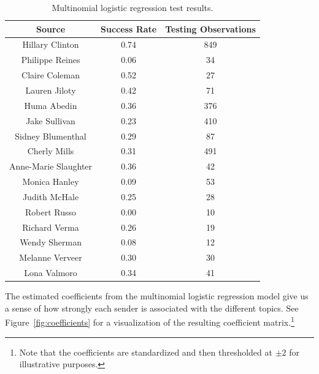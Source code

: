 \documentclass[12pt]{article}
\theoremstyle{definition}
\theoremstyle{algodesc}
\begin{document}
\begin{table}[htb] \centering
\begin{tabular}{ccc}
  \toprule
  Source               & Success Rate & Testing Observations \\
  \midrule
  Hillary Clinton      & 0.74         & 849 \\
  Philippe Reines      & 0.06         & 34 \\
  Claire Coleman       & 0.52         & 27 \\
  Lauren Jiloty        & 0.42         & 71 \\
  Huma Abedin          & 0.36         & 376 \\
  Jake Sullivan        & 0.23         & 410 \\
  Sidney Blumenthal    & 0.29         & 87 \\
  Cherly Mills         & 0.31         & 491 \\
  Anne-Marie Slaughter & 0.36         & 42 \\
  Monica Hanley        & 0.09         & 53 \\
  Judith McHale        & 0.25         & 28 \\
  Robert Russo         & 0.00         & 10 \\
  Richard Verma        & 0.26         & 19 \\
  Wendy Sherman        & 0.08         & 12 \\
  Melanne Verveer      & 0.30         & 30 \\
  Lona Valmoro         & 0.34         & 41 \\
  \bottomrule
\end{tabular}
\caption{Multinomial logistic regression test results.}
\label{tab:mlr_success}
\end{table}

The estimated coefficients from the multinomial logistic regression model give us a sense of how strongly each sender is associated with the different topics. See Figure~\ref{fig:coefficients} for a visualization of the resulting coefficient matrix.\footnote{Note that the coefficients are standardized and then thresholded at $\pm2$ for illustrative purposes.}
\end{document}
